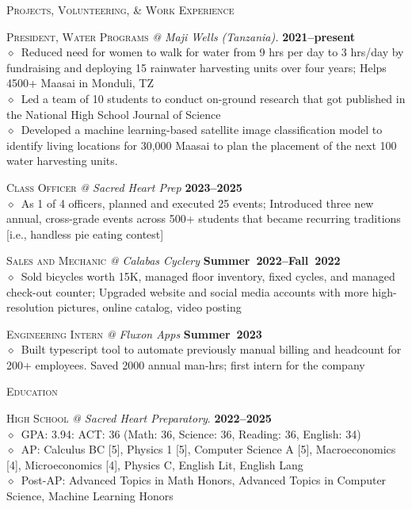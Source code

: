 \documentclass[11pt, a4paper]{article}
\newcommand{\dates}[1]{\hfill\mbox{\textbf{#1}}} %
\newcommand{\smaller}[1]{{\small$\diamond$\ #1}}
\newcommand{\headright}[1]{\vspace*{2.5ex}\textsc{\Large\color{cvblue}#1}\par%
     \vspace*{-2ex}{\color{cvblue}\hrulefill}\par}
\begin{document}
\begin{minipage}[t]{0.56\textwidth}
\setlength{\parskip}{0.8ex}%

\vspace{2ex}



\headright{Projects, Volunteering, \& Work Experience}

\textsc{President, Water Programs} \textit{@ Maji Wells (Tanzania).}  \dates{2021--present} \\
\smaller{Reduced need for women to walk for water from 9 hrs per day to 3 hrs/day by fundraising and deploying 15 rainwater harvesting units over four years; Helps 4500+ Maasai in Monduli, TZ} \\
\smaller{Led a team of 10 students to conduct on-ground research that got published in the National High School Journal of Science} \\
\smaller{Developed a machine learning-based satellite image classification model to identify living locations for 30,000 Maasai to plan the placement of the next 100 water harvesting units.}

\textsc{Class Officer} \textit{@ Sacred Heart Prep}  \dates{2023--2025} \\
\smaller{As 1 of 4 officers, planned and executed 25 events; Introduced three new annual, cross-grade events across 500+ students that became recurring traditions [i.e., handless pie eating contest]}


\textsc{Sales and Mechanic} \textit{@ Calabas Cyclery}  \dates{Summer 2022--Fall 2022} \\
\smaller{Sold bicycles worth 15K, managed floor inventory, fixed cycles, and managed check-out counter; Upgraded  website and social media accounts with more high-resolution pictures, online catalog, video posting}

\textsc{Engineering Intern} \textit{@ Fluxon Apps}  \dates{Summer 2023} \\
\smaller{Built typescript tool to automate previously manual billing and headcount for 200+ employees. Saved 2000 annual man-hrs; first intern for the company}




\headright{Education}

\textsc{High School} \textit{@ Sacred Heart Preparatory}. \dates{2022--2025} \\
\smaller {GPA: 3.94: ACT: 36 (Math: 36, Science: 36, Reading: 36, English: 34)}\\
\smaller {AP: Calculus BC [5], Physics 1 [5], Computer Science A [5],  Macroeconomics [4], Microeconomics [4], Physics C, English Lit, English Lang}\\
\smaller{Post-AP: Advanced Topics in Math Honors, Advanced Topics in Computer Science, Machine Learning Honors}


\end{minipage}
\end{document}
